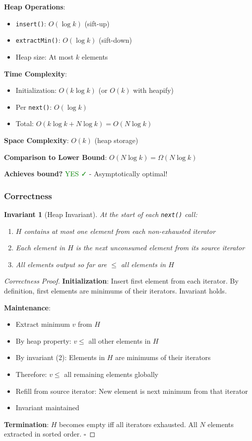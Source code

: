\documentclass[11pt]{article}
\newtheorem{invariant}{Invariant}
\begin{document}
\textbf{Heap Operations}:
\begin{itemize}
    \item \texttt{insert()}: $O(\log k)$ (sift-up)
    \item \texttt{extractMin()}: $O(\log k)$ (sift-down)
    \item Heap size: At most $k$ elements
\end{itemize}

\textbf{Time Complexity}:
\begin{itemize}
    \item Initialization: $O(k \log k)$ (or $O(k)$ with heapify)
    \item Per \texttt{next()}: $O(\log k)$
    \item Total: $O(k \log k + N \log k) = O(N \log k)$
\end{itemize}

\textbf{Space Complexity}: $O(k)$ (heap storage)

\textbf{Comparison to Lower Bound}: $O(N \log k) = \Omega(N \log k)$

\textbf{Achieves bound?} \textcolor{green}{YES ✓} - Asymptotically optimal!

\subsubsection{Correctness}

\begin{invariant}[Heap Invariant]
At the start of each \texttt{next()} call:
\begin{enumerate}
    \item $H$ contains at most one element from each non-exhausted iterator
    \item Each element in $H$ is the next unconsumed element from its source iterator
    \item All elements output so far are $\leq$ all elements in $H$
\end{enumerate}
\end{invariant}

\begin{proof}[Correctness Proof]
\textbf{Initialization}: Insert first element from each iterator. By definition, first elements are minimums of their iterators. Invariant holds.

\textbf{Maintenance}:
\begin{itemize}
    \item Extract minimum $v$ from $H$
    \item By heap property: $v \leq $ all other elements in $H$
    \item By invariant (2): Elements in $H$ are minimums of their iterators
    \item Therefore: $v \leq $ all remaining elements globally
    \item Refill from source iterator: New element is next minimum from that iterator
    \item Invariant maintained
\end{itemize}

\textbf{Termination}: $H$ becomes empty iff all iterators exhausted. All $N$ elements extracted in sorted order. $\square$
\end{proof}
\end{document}
